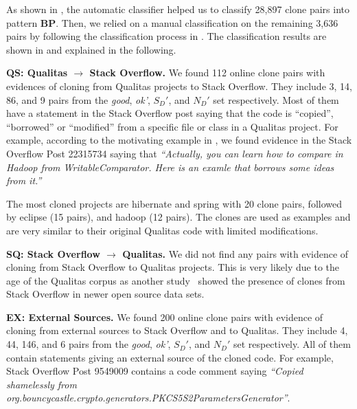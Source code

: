 \documentclass[sigconf,review, anonymous]{acmart}
\begin{document}
As shown in , the automatic
classifier helped us to classify 28,897 clone pairs into
pattern \textbf{BP}. Then, we relied on a manual classification
on the remaining 3,636 pairs by following the classification process
in . 
%
The classification results are shown in  
and explained in the following.

\textbf{QS: Qualitas $\rightarrow$ Stack Overflow.} We found 112
online clone pairs with evidences of cloning from Qualitas projects to
Stack Overflow. They include 3, 14, 86, and 9 pairs from the
\textit{good}, \textit{ok'}, $S_D'$, and $N_D'$ set respectively. Most of
them have a statement in the Stack Overflow post saying that the code
is ``copied'', ``borrowed'' or ``modified'' from a specific file or class in a
Qualitas project. For example, according to the motivating example in 
, we found evidence in the Stack Overflow 
Post 22315734 saying that \textit{``Actually, you can learn how to compare 
in Hadoop from WritableComparator. Here is an examle that borrows 
some ideas from it.''}

The most cloned projects are \textsf{hibernate} and
\textsf{spring} with 20 clone pairs, followed by \textsf{eclipse} (15
pairs), and \textsf{hadoop} (12 pairs). The clones are used as
examples and are very similar to their original Qualitas code with
limited modifications.

\textbf{SQ: Stack Overflow $\rightarrow$ Qualitas.} We did not find
any pairs with evidence of cloning from Stack Overflow to Qualitas
projects. This is very likely due to the age of the Qualitas corpus as
another study~\cite{An2017} showed the presence of clones from Stack
Overflow in newer open source data sets.

\textbf{EX: External Sources.} We found 200 online clone pairs with
evidence of cloning from external sources to Stack Overflow and to Qualitas.  
They include 4, 44, 146, and 6 pairs from the \textit{good}, \textit{ok'},
$S_D'$, and $N_D'$ set respectively. All of them contain statements
giving an external source of the cloned code.  For example, Stack
Overflow Post 9549009 contains a code comment saying \textit{``Copied
  shamelessly from
  org.bouncycastle.crypto.generators.PKCS5S2ParametersGenerator''}.
\end{document}

